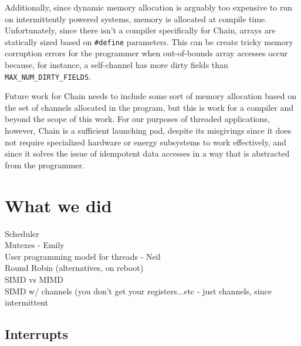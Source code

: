 \documentclass[11pt]{sensys-proc}
\newcommand{\chain}{Chain\xspace}
\begin{document}
Additionally, since dynamic memory allocation is arguably too expensive to run
on intermittently powered systems, memory is allocated at compile time.
Unfortunately, since there isn't a compiler specifically for \chain, arrays
are statically sized based on \texttt{\#define} parameters. This can be
create tricky memory corruption errors for the programmer when out-of-bounds
array accesses occur because, for instance, a self-channel has more dirty
fields than \texttt{MAX\_NUM\_DIRTY\_FIELDS}.


Future work for \chain needs to include some sort of memory allocation based on
the set of channels allocated in the program, but this is work for a compiler
and beyond the scope of this work. For our purposes of threaded applications,
however, \chain is a sufficient launching pad, despite its misgivings since it
does not require specialized hardware or energy subsystems to work effectively,
and since it solves the issue of idempotent data accesses in a way that is
abstracted from the programmer.


\section{What we did} %
Scheduler\\
Mutexes - Emily\\
User programming model for threads - Neil\\
Round Robin (alternatives, on reboot)\\
SIMD vs MIMD\\
SIMD w/ channels (you don't get your registers...etc -
    just channels, since intermittent\\
\subsection{Interrupts}
\end{document}
